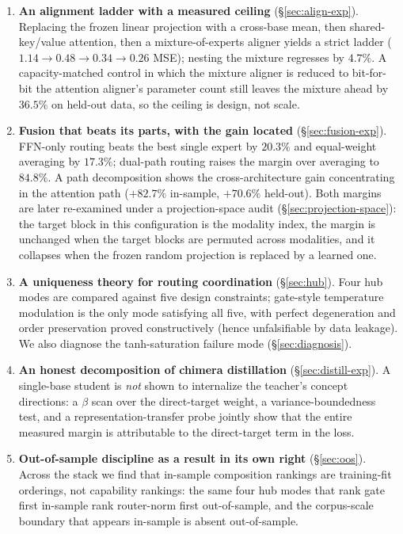 \documentclass[10pt]{article}
\theoremstyle{definition}
\theoremstyle{plain}
\theoremstyle{remark}
\begin{document}
\begin{enumerate}[leftmargin=1.5em, itemsep=1pt]
    \item \textbf{An alignment ladder with a measured ceiling} (\S\ref{sec:align-exp}). Replacing the frozen linear projection with a cross-base mean, then shared-key/value attention, then a mixture-of-experts aligner yields a strict ladder ($1.14 \rightarrow 0.48 \rightarrow 0.34 \rightarrow 0.26$ MSE); nesting the mixture regresses by $4.7\%$. A capacity-matched control in which the mixture aligner is reduced to bit-for-bit the attention aligner's parameter count still leaves the mixture ahead by $36.5\%$ on held-out data, so the ceiling is design, not scale.
    \item \textbf{Fusion that beats its parts, with the gain located} (\S\ref{sec:fusion-exp}). FFN-only routing beats the best single expert by $20.3\%$ and equal-weight averaging by $17.3\%$; dual-path routing raises the margin over averaging to $84.8\%$. A path decomposition shows the cross-architecture gain concentrating in the attention path ($+82.7\%$ in-sample, $+70.6\%$ held-out). Both margins are later re-examined under a projection-space audit (\S\ref{sec:projection-space}): the target block in this configuration is the modality index, the margin is unchanged when the target blocks are permuted across modalities, and it collapses when the frozen random projection is replaced by a learned one.
    \item \textbf{A uniqueness theory for routing coordination} (\S\ref{sec:hub}). Four hub modes are compared against five design constraints; gate-style temperature modulation is the only mode satisfying all five, with perfect degeneration and order preservation proved constructively (hence unfalsifiable by data leakage). We also diagnose the tanh-saturation failure mode (\S\ref{sec:diagnosis}).
    \item \textbf{An honest decomposition of chimera distillation} (\S\ref{sec:distill-exp}). A single-base student is \emph{not} shown to internalize the teacher's concept directions: a $\beta$ scan over the direct-target weight, a variance-boundedness test, and a representation-transfer probe jointly show that the entire measured margin is attributable to the direct-target term in the loss.
    \item \textbf{Out-of-sample discipline as a result in its own right} (\S\ref{sec:oos}). Across the stack we find that in-sample composition rankings are training-fit orderings, not capability rankings: the same four hub modes that rank gate first in-sample rank router-norm first out-of-sample, and the corpus-scale boundary that appears in-sample is absent out-of-sample.
\end{enumerate}
\end{document}
